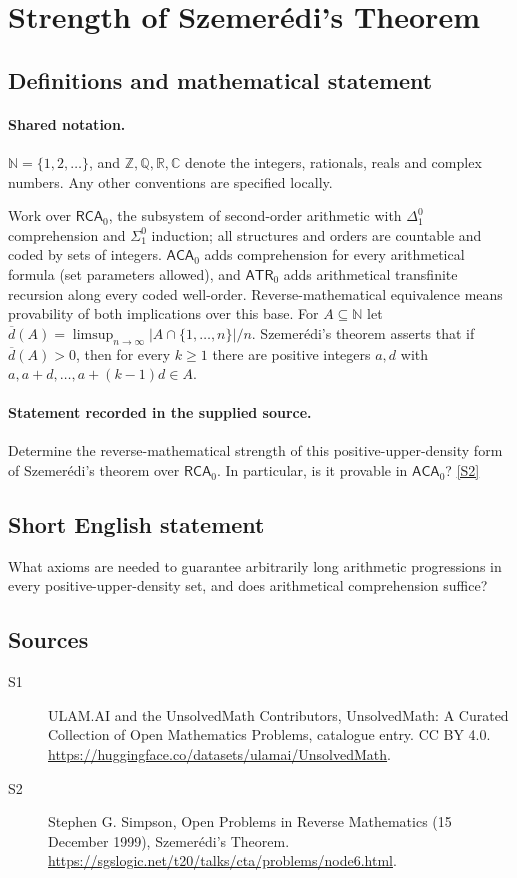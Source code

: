 \documentclass[11pt]{article}
\newcommand{\sref}[2]{\hyperlink{source:#1:#2}{[S#2]}}
\begin{document}
\section{Strength of Szemerédi's Theorem}\label{statement}

\subsection{Definitions and mathematical statement}

\paragraph{Shared notation.}$\mathbb N=\{1,2,\ldots\}$, and $\mathbb Z,\mathbb Q,\mathbb R,\mathbb C$ denote the integers, rationals, reals and complex numbers. Any other conventions are specified locally.


Work over $\mathsf{RCA}_0$, the subsystem of second-order arithmetic with $\Delta^0_1$ comprehension and $\Sigma^0_1$ induction; all structures and orders are countable and coded by sets of integers. $\mathsf{ACA}_0$ adds comprehension for every arithmetical formula (set parameters allowed), and $\mathsf{ATR}_0$ adds arithmetical transfinite recursion along every coded well-order. Reverse-mathematical equivalence means provability of both implications over this base. For $A\subseteq\mathbb N$ let $\overline d(A)=\limsup_{n\to\infty}|A\cap\{1,\ldots,n\}|/n$. Szemerédi's theorem asserts that if $\overline d(A)>0$, then for every $k\ge1$ there are positive integers $a,d$ with $a,a+d,\ldots,a+(k-1)d\in A$.
\paragraph{Statement recorded in the supplied source.}
Determine the reverse-mathematical strength of this positive-upper-density form of Szemerédi's theorem over $\mathsf{RCA}_0$. In particular, is it provable in $\mathsf{ACA}_0$? \sref{statement}{2}
\subsection{Short English statement}
What axioms are needed to guarantee arbitrarily long arithmetic progressions in every positive-upper-density set, and does arithmetical comprehension suffice?
\subsection{Sources}
\begin{description}
\item[\hypertarget{source:statement:1}{S1}] ULAM.AI and the UnsolvedMath Contributors, UnsolvedMath: A Curated Collection of Open Mathematics Problems, catalogue entry. CC BY 4.0. \url{https://huggingface.co/datasets/ulamai/UnsolvedMath}.
\item[\hypertarget{source:statement:2}{S2}] Stephen G. Simpson, Open Problems in Reverse Mathematics (15 December 1999), Szemerédi's Theorem. \url{https://sgslogic.net/t20/talks/cta/problems/node6.html}.
\end{description}
\label{end:statement}
\end{document}
